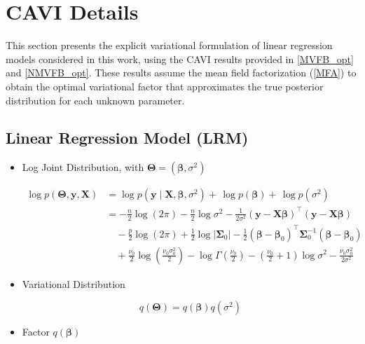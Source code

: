 \begin{appendix}
\begin{itemize}
\end{itemize}

\chapter{CAVI Details}
\label{Appendix_C}

This section presents the explicit variational formulation of linear regression models considered in this work, using the CAVI results provided in \ref{MVFB_opt} and \ref{NMVFB_opt}. These results assume the mean field factorization (\ref{MFA}) to obtain the optimal variational factor that approximates the true posterior distribution for each unknown parameter.

\section{Linear Regression Model (LRM)}

\begin{itemize}

\item Log Joint Distribution, with $\bm{\Theta}=(\bm{\beta},\sigma^2)$

\begin{equation}
\begin{split}
\log p(\bm{\Theta},\bm{y}, \bm{X})
&= 
\log p(\bm{y} \mid \bm{X}, \bm{\beta}, \sigma^2) +\,
\log  p(\bm{\beta}) +\,
\log p(\sigma^2 ) \\
&=-\frac{n}{2}\log(2\pi) - \frac{n}{2}\log\sigma^{2}
- \frac{1}{2\sigma^{2}}
(\bm y-\bm X\bm\beta)^{\top}
(\bm y-\bm X\bm\beta)\\
&\quad - \frac{p}{2}\log(2\pi) + \frac{1}{2}\log|\bm\Sigma_{0}|
- \frac{1}{2}
(\bm\beta-\bm\beta_{0})^{\top}
\bm\Sigma_{0}^{-1}(\bm\beta-\bm\beta_{0})\\
&\quad + \frac{\nu_{0}}{2}\log \left(\frac{\nu_0\sigma_{0}^2}{2}\right) - \log\Gamma\left(\frac{\nu_{0}}{2}\right)
- \left(\frac{\nu_{0}}{2}+1\right)\log\sigma^{2}
- \frac{\nu_0\sigma_{0}^2}{2\sigma^{2}}
\end{split}
\end{equation}

\item Variational Distribution

\begin{equation}
q\left(\bm{\Theta}\right)=q(\bm{\beta})q(\sigma^2)
\end{equation}

\item Factor $q(\bm{\beta})$


\end{itemize}
\end{appendix}
